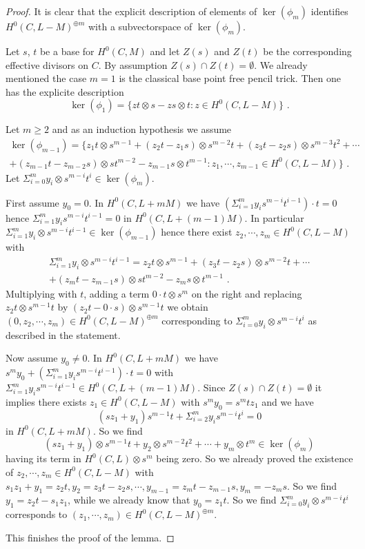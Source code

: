 \documentclass{article}
\theoremstyle{definition}
\theoremstyle{remark}
\begin{document}
\begin{proof}
It is clear that the explicit description of elements of $\ker (\phi_m)$ identifies $H^0(C,L-M)^{\oplus m}$ with a subvectorspace of $\ker (\phi _m)$.

Let $s$, $t$ be a base for $H^0(C,M)$ and let $Z(s)$ and $Z(t)$ be the corresponding effective divisors on $C$.
By assumption $Z(s) \cap Z(t) = \emptyset$.
We already mentioned the case $m=1$ is the classical base point free pencil trick.
Then one has the explicite description
\[
\ker (\phi _1) = \{zt\otimes s-zs \otimes t : z \in H^0(C,L-M) \} \text { .}
\]

Let $m \geq 2$ and as an induction hypothesis we assume
\begin{multline*}
\ker (\phi _{m-1}) = \{ z_1t\otimes s^{m-1}+(z_2t-z_1s)\otimes s^{m-2}t +(z_3t-z_2s)\otimes s^{m-3}t^2+ \cdots \\
+(z_{m-1}t-z_{m-2}s) \otimes st^{m-2}-z_{m-1}s\otimes t^{m-1} : z_1, \cdots , z_{m-1} \in H^0(C,L-M) \} \text { .}
\end{multline*}
Let $\Sigma _{i=0}^m y_i \otimes s^{m-i}t^i \in \ker (\phi _m)$.

First assume $y_0=0$.
In $H^0(C,L+mM)$ we have $(\Sigma_{i=1}^my_is^{m-i}t^{i-1})\cdot t=0$ hence $\Sigma _{i=1}^my_is^{m-i}t^{i-1}=0$ in $H^0(C,L+(m-1)M)$.
In particular $\Sigma _{i=1}^my_i\otimes s^{m-i}t^{i-1} \in \ker (\phi_{m-1})$ hence there exist $z_2, \cdots , z_m \in H^0(C,L-M)$ with
\begin{multline*}
\Sigma _{i=1}^my_i\otimes s^{m-i}t^{i-1}=z_2t\otimes s^{m-1}+(z_3t-z_2s)\otimes s^{m-2}t + \cdots \\
+ (z_mt-z_{m-1}s)\otimes st^{m-2}-z_ms\otimes t^{m-1} \text { .}
\end{multline*}
Multiplying with $t$, adding a term $0 \cdot t \otimes s^m$ on the right and replacing $z_2t\otimes s^{m-1}t$ by $(z_2t-0\cdot s)\otimes s^{m-1}t$ we obtain $(0,z_2, \cdots , z_m) \in H^0(C,L-M)^{\oplus m}$ corresponding to $\Sigma _{i=0}^m y_i \otimes s^{m-i}t^i$ as described in the statement.

Now assume $y_0 \neq 0$.
In $H^0(C,L+mM)$ we have $s^my_0+(\Sigma _{i=1}^my_is^{m-i}t^{i-1})\cdot t=0$ with $\Sigma _{i=1}^my_is^{m-i}t^{i-1} \in H^0(C,L+(m-1)M)$.
Since $Z(s) \cap Z(t) = \emptyset$ it implies there exists $z_1 \in H^0(C,L-M)$ with $s^my_0 = s^mtz_1$ and we have
\[
(sz_1+y_1)s^{m-1}t+\Sigma _{i=2}^m y_is^{m-i}t^i=0
\]
in $H^0(C,L+mM)$.
So we find
\[
(sz_1+y_1)\otimes s^{m-1}t + y_2 \otimes s^{m-2}t^2 + \cdots + y_m \otimes t^m \in \ker (\phi _m)
\]
having its term in $H^0(C,L) \otimes s^m$ being zero.
So we already proved the existence of $z_2, \cdots , z_m \in H^0(C,L-M)$ with $s_1z_1+y_1=z_2t, y_2=z_3t-z_2s, \cdots , y_{m-1}=z_mt-z_{m-1}s, y_m=-z_ms$.
So we find $y_1=z_2t-s_1z_1$, while we already know that $y_0=z_1t$.
So we find $\Sigma _{i=0}^m y_i \otimes s^{m-i}t^i$ corresponds to $(z_1, \cdots , z_m) \in H^0(C,L-M)^{\oplus m}$.

This finishes the proof of the lemma.
\end{proof}
\end{document}
